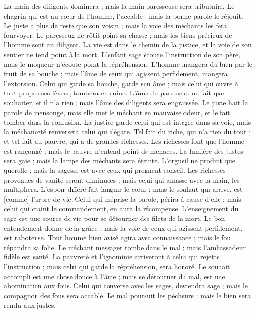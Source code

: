 \begin{multicols}{2}
La main des diligents dominera ; mais la main paresseuse sera tributaire.
Le chagrin qui est au cœur de l'homme, l'accable ; mais la bonne parole le réjouit.
Le juste a plus de reste que son voisin ; mais la voie des méchants les fera fourvoyer.
Le paresseux ne rôtit point sa chasse ; mais les biens précieux de l'homme sont au diligent.
La vie est dans le chemin de la justice, et la voie de son sentier ne tend point à la mort.
\VerseOne{}L'enfant sage écoute l'instruction de son père, mais le moqueur n'écoute point la répréhension.
L'homme mangera du bien par le fruit de sa bouche ; mais l'âme de ceux qui agissent perfidement, mangera l'extorsion.
Celui qui garde sa bouche, garde son âme ; mais celui qui ouvre à tout propos ses lèvres, tombera en ruine.
L'âme du paresseux ne fait que souhaiter, et il n'a rien ; mais l'âme des diligents sera engraissée.
Le juste hait la parole de mensonge, mais elle met le méchant en mauvaise odeur, et le fait tomber dans la confusion.
La justice garde celui qui est intègre dans sa voie, mais la méchanceté renversera celui qui s'égare.
Tel fait du riche, qui n'a rien du tout ; et tel fait du pauvre, qui a de grandes richesses.
Les richesses font que l'homme est rançonné ; mais le pauvre n'entend point de menaces.
La lumière des justes sera gaie ; mais la lampe des méchants sera éteinte.
L'orgueil ne produit que querelle ; mais la sagesse est avec ceux qui prennent conseil.
Les richesses provenues de vanité seront diminuées ; mais celui qui amasse avec la main, les multipliera.
L'espoir différé fait languir le cœur ; mais le souhait qui arrive, est [comme] l'arbre de vie.
Celui qui méprise la parole, périra à cause d'elle ; mais celui qui craint le commandement, en aura la récompense.
L'enseignement du sage est une source de vie pour se détourner des filets de la mort.
Le bon entendement donne de la grâce ; mais la voie de ceux qui agissent perfidement, est raboteuse.
Tout homme bien avisé agira avec connaissance ; mais le fou répandra sa folie.
Le méchant messager tombe dans le mal ; mais l'ambassadeur fidèle est santé.
La pauvreté et l'ignominie arriveront à celui qui rejette l'instruction ; mais celui qui garde la répréhension, sera honoré.
Le souhait accompli est une chose douce à l'âme ; mais se détourner du mal, est une abomination aux fous.
Celui qui converse avec les sages, deviendra sage ; mais le compagnon des fous sera accablé.
Le mal poursuit les pécheurs ; mais le bien sera rendu aux justes.

\end{multicols}
